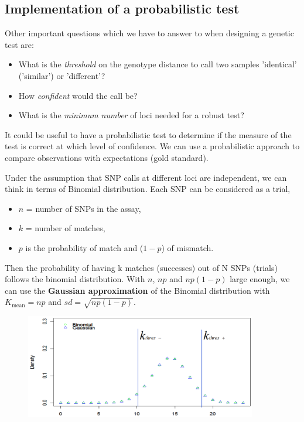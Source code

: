 \subsection{Implementation of a probabilistic test} 

Other important questions which we have to answer to when designing a genetic
test are:
\begin{itemize}
	\item What is the \textit{threshold} on the genotype distance to call two
	samples 'identical' ('similar') or 'different'?
	\item How \textit{confident} would the call be?
    \item What is the \textit{minimum number} of loci needed for a robust test?
\end{itemize}

It could be useful to have a probabilistic test to determine if the measure of
the test is correct at which level of confidence. We can use a probabilistic
approach to compare observations with expectations (gold standard).

\bigskip
Under the assumption that SNP calls at different loci are independent, we can
think in terms of Binomial distribution. Each SNP can be considered as a trial,

\begin{itemize}
	\item $n$ = number of SNPs in the assay, 
	\item $k$ = number of matches, 
	\item $p$ is the probability of match and ($1-p$) of mismatch.
\end{itemize}

Then the probability of having k matches (successes) out of N SNPs (trials)
follows the binomial distribution. With $n$, $np$ and $np(1-p)$ large enough, we
can use the \textbf{Gaussian approximation} of the Binomial distribution with
$K_{\text{mean}} = np$ and $sd = \sqrt{np(1-p)}$. \\

\begin{figure}[H]
	\centering
	\includegraphics[width=0.9\textwidth]{binomialDistSNPsmatches.PNG}
	\caption{\label{fig:binomial distribution SNP matches}}
\end{figure}

